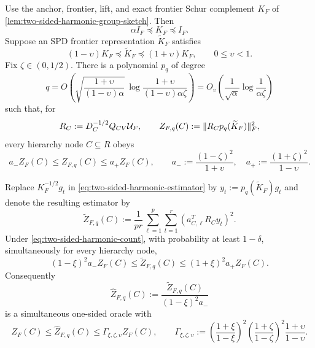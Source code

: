 \begin{theorem}
\label{thm:chebyshev-frontier-whitening}
Use the anchor, frontier, lift, and exact frontier Schur complement $K_F$ of
\cref{lem:two-sided-harmonic-group-sketch}.  Then
\begin{equation}
 \alpha I_F\preceq K_F\preceq I_F.
 \label{eq:frontier-schur-spectrum}
\end{equation}
Suppose an SPD frontier representation $\widetilde K_F$ satisfies
\begin{equation}
 (1-\upsilon)K_F\preceq\widetilde K_F
 \preceq(1+\upsilon)K_F,
 \qquad 0\leq\upsilon<1.
 \label{eq:frontier-spectral-approximation}
\end{equation}
Fix $\zeta\in(0,1/2)$.  There is a polynomial $p_q$ of degree
\begin{equation}
 q=O\!\left(
 \sqrt{\frac{1+\upsilon}{(1-\upsilon)\alpha}}\,
 \log\frac{1+\upsilon}{(1-\upsilon)\alpha\zeta}
 \right)
 =O_\upsilon\!\left(
 \frac1{\sqrt\alpha}\log\frac1{\alpha\zeta}
 \right)
 \label{eq:frontier-whitening-degree}
\end{equation}
such that, for
\begin{equation*}
 R_C:=D_C^{-1/2}Q_{CV}\mathcal U_F,
 \qquad
 Z_{F,q}(C):=\lVert R_Cp_q(\widetilde K_F)\rVert_F^2,
\end{equation*}
every hierarchy node $C\subseteq R$ obeys
\begin{equation}
 a_-Z_F(C)\leq Z_{F,q}(C)\leq a_+Z_F(C),
 \qquad
 a_-:=\frac{(1-\zeta)^2}{1+\upsilon},
 \quad
 a_+:=\frac{(1+\zeta)^2}{1-\upsilon}.
 \label{eq:frontier-whitening-sandwich}
\end{equation}

Replace $K_F^{-1/2}g_t$ in
\cref{eq:two-sided-harmonic-estimator} by
$y_t:=p_q(\widetilde K_F)g_t$ and denote the resulting estimator by
\begin{equation}
 \widetilde Z_{F,q}(C)
 :=\frac1{pr}\sum_{\ell=1}^p\sum_{t=1}^r
 \left(a_{C,\ell}^TR_Cy_t\right)^2.
 \label{eq:chebyshev-whitened-group-estimator}
\end{equation}
Under \cref{eq:two-sided-harmonic-count}, with probability at least
$1-\delta$, simultaneously for every hierarchy node,
\begin{equation}
 (1-\xi)^2a_-Z_F(C)
 \leq\widetilde Z_{F,q}(C)
 \leq(1+\xi)^2a_+Z_F(C).
 \label{eq:chebyshev-whitened-group-guarantee}
\end{equation}
Consequently
\begin{equation}
 \widehat Z_{F,q}(C)
 :=\frac{\widetilde Z_{F,q}(C)}{(1-\xi)^2a_-}
 \label{eq:chebyshev-whitened-one-sided}
\end{equation}
is a simultaneous one-sided oracle with
\begin{equation}
 Z_F(C)\leq\widehat Z_{F,q}(C)
 \leq\Gamma_{\xi,\zeta,\upsilon}Z_F(C),
 \qquad
 \Gamma_{\xi,\zeta,\upsilon}
 :=
 \left(\frac{1+\xi}{1-\xi}\right)^2
 \left(\frac{1+\zeta}{1-\zeta}\right)^2
 \frac{1+\upsilon}{1-\upsilon}.
 \label{eq:chebyshev-whitened-oracle-factor}
\end{equation}


\end{theorem}
